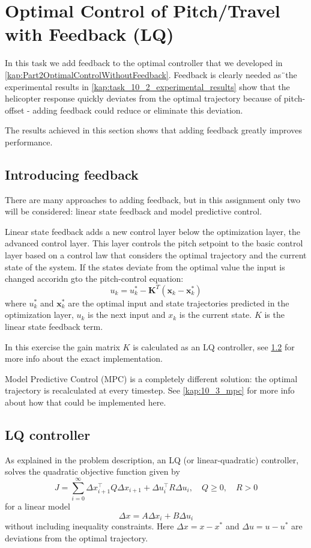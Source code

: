 \documentclass[../main.tex]{subfiles}
\begin{document}
\section{Optimal Control of Pitch/Travel with Feedback (LQ)}
In this task we add feedback to the optimal controller that we developed in \cref{kap:Part2OptimalControlWithoutFeedback}. Feedback is clearly needed as¨the experimental results in \cref{kap:task_10_2_experimental_results} show that the helicopter response quickly deviates from the optimal trajectory because of pitch-offset - adding feedback could reduce or eliminate this deviation.

The results achieved in this section shows that adding feedback greatly improves performance.

\subsection{Introducing feedback}
There are many approaches to adding feedback, but in this assignment only two will be considered: linear state feedback and model predictive control.

Linear state feedback adds a new control layer below the optimization layer, the advanced control layer. This layer controls the pitch setpoint to the basic control layer based on a control law that considers the optimal trajectory and the current state of the system. If the states deviate from the optimal value the input is changed accoridn gto the pitch-control equation:
\begin{equation}\label{eq:lab3_feedback}
	u_k = u_k^* - \bm{K}^T(\bm x_k - \bm x_k^*)
\end{equation}
where $u_k^*$ and $\bm x_k^*$ are the optimal input and state trajectories predicted in the optimization layer, $u_k$ is the next input and $x_k$ is the current state. $K$ is the linear state feedback term. 

In this exercise the gain matrix $K$ is calculated as an LQ controller, see \cref{kap:task_10_3_LQ_controller} for more info about the exact implementation.

Model Predictive Control (MPC) is a completely different solution: the optimal trajectory is recalculated at every timestep. See \cref{kap:10_3_mpc} for more info about how that could be implemented here.

\subsection{LQ controller}\label{kap:task_10_3_LQ_controller}
As explained in the problem description, an LQ (or linear-quadratic) controller, solves the quadratic objective function given by
\begin{equation}
    J = \sum^\infty_{i=0} \Delta x_{i+1}^\top Q \Delta x_{i+1} + \Delta u_i^\top R \Delta u_i, \quad Q \ge0, \quad R > 0
\end{equation}
for a linear model
\begin{equation}\label{eq:lab3_lin_model}
	\Delta x=A\Delta x_i + B \Delta u_i
\end{equation}
without including inequality constraints.
Here $ \Delta x = x - x^*$ and $\Delta u = u - u^*$ are deviations from the optimal trajectory.
\end{document}
